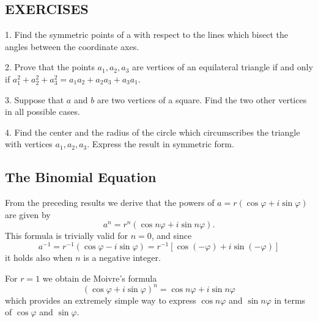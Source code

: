 \subsection*{EXERCISES}
1. Find the symmetric points of a with respect to the lines which bisect the angles between the coordinate axes.

2. Prove that the points $a_{1}, a_{2}, a_{3}$ are vertices of an equilateral triangle if and only if $a_{1}^{2} + a_{2}^{2} + a_{3}^{2} = a_{1}a_{2} + a_{2}a_{3} + a_{3}a_{1}$.

3. Suppose that $a$ and $b$ are two vertices of a square. Find the two other vertices in all possible cases.

4. Find the center and the radius of the circle which circumscribes the triangle with vertices $a_{1}, a_{2}, a_{3}$. Express the result in symmetric form.

\setcounter{section}{2}\setcounter{subsection}{1}\subsection{The Binomial Equation}\label{sec:1.2.2}
From the preceding results we derive that the powers of $a = r(\cos \varphi + i\sin \varphi)$ are given by
\begin{equation*}
a ^ {n} = r ^ {n} (\cos n \varphi + i \sin n \varphi).\tag{19}\label{eq:1.19}
\end{equation*}
This formula is trivially valid for $n = 0$, and since
\begin{equation*}
a ^ {- 1} = r ^ {- 1} (\cos \varphi - i \sin \varphi) = r ^ {- 1} [ \cos (- \varphi) + i \sin (- \varphi) ]
\end{equation*}
it holds also when $n$ is a negative integer.

For $r = 1$ we obtain de Moivre's formula
\begin{equation*}
(\cos \varphi + i \sin \varphi) ^ {n} = \cos n \varphi + i \sin n \varphi\tag{20}\label{eq:1.20}
\end{equation*}
which provides an extremely simple way to express $\cos n\varphi$ and $\sin n\varphi$ in terms of $\cos \varphi$ and $\sin \varphi$.

